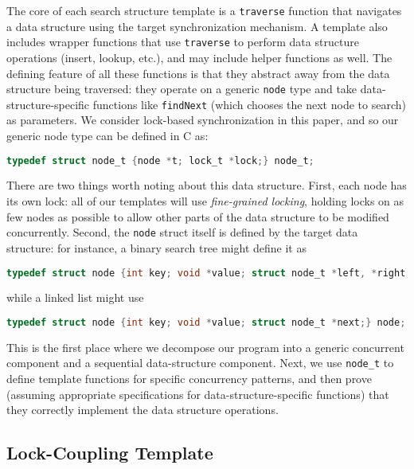 \documentclass[a4paper,UKenglish,cleveref, autoref, thm-restate]{lipics-v2021}
\begin{document}
The core of each search structure template is a \lstinline{traverse} function that navigates a data structure using the target synchronization mechanism. A template also includes wrapper functions that use \lstinline{traverse} to perform data structure operations (insert, lookup, etc.), and may include helper functions as well. The defining feature of all these functions is that they abstract away from the data structure being traversed: they operate on a generic \lstinline{node} type and take data-structure-specific functions like \lstinline{findNext} (which chooses the next node to search) as parameters. We consider lock-based synchronization in this paper, and so our generic node type can be defined in C as:
\begin{lstlisting}[language = C, backgroundcolor=\color{white}, basicstyle=\ttfamily\footnotesize]
typedef struct node_t {node *t; lock_t *lock;} node_t;
\end{lstlisting}
There are two things worth noting about this data structure. First, each node has its own lock: all of our templates will use \emph{fine-grained locking}, holding locks on as few nodes as possible to allow other parts of the data structure to be modified concurrently. Second, the \lstinline{node} struct itself is defined by the target data structure: for instance, a binary search tree might define it as 
\begin{lstlisting}[language = C, backgroundcolor=\color{white}, basicstyle=\ttfamily\footnotesize]
typedef struct node {int key; void *value; struct node_t *left, *right;} node;
\end{lstlisting}
while a linked list might use
\begin{lstlisting}[language = C, backgroundcolor=\color{white}, basicstyle=\ttfamily\footnotesize]
typedef struct node {int key; void *value; struct node_t *next;} node;
\end{lstlisting}
This is the first place where we decompose our program into a generic concurrent component and a sequential data-structure component. Next, we use \lstinline{node_t} to define template functions for specific concurrency patterns, and then prove (assuming appropriate specifications for data-structure-specific functions) that they correctly implement the data structure operations.

\subsection{Lock-Coupling Template}
\label{lock-coupling-algo}
\end{document}
